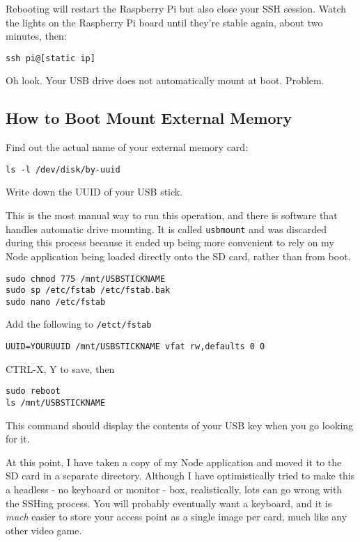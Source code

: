 Rebooting will restart the Raspberry Pi but also close your SSH session. Watch the lights on the Raspberry Pi board until they're stable again, about two minutes, then:
\begin{lstlisting}
ssh pi@[static ip]
\end{lstlisting}

Oh look. Your USB drive does not automatically mount at boot. Problem.

\subsection{How to Boot Mount External Memory}

Find out the actual name of your external memory card:
\begin{lstlisting}
ls -l /dev/disk/by-uuid
\end{lstlisting}

Write down the UUID of your USB stick.

This is the most manual way to run this operation, and there is software that handles automatic drive mounting. It is called \texttt{usbmount} and was discarded during this process because it ended up being more convenient to rely on my Node application being loaded directly onto the SD card, rather than from boot.

\begin{lstlisting}
sudo chmod 775 /mnt/USBSTICKNAME
sudo sp /etc/fstab /etc/fstab.bak
sudo nano /etc/fstab
\end{lstlisting}

Add the following to \texttt{/etct/fstab}
\begin{lstlisting}
UUID=YOURUUID /mnt/USBSTICKNAME vfat rw,defaults 0 0
\end{lstlisting}

CTRL-X, Y to save, then
\begin{lstlisting}
sudo reboot
ls /mnt/USBSTICKNAME
\end{lstlisting}

This command should display the contents of your USB key when you go looking for it.

At this point, I have taken a copy of my Node application and moved it to the SD card in a separate directory. Although I have optimistically tried to make this a headless - no keyboard or monitor - box, realistically, lots can go wrong with the SSHing process. You will probably eventually want a keyboard, and it is \textit{much} easier to store your access point as a single image per card, much like any other video game.

